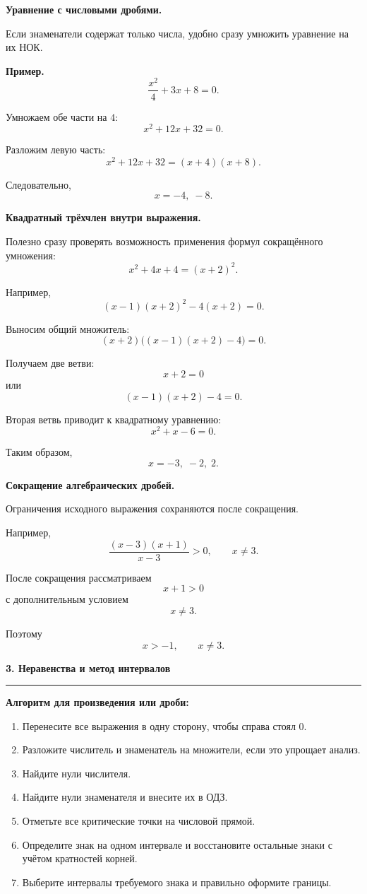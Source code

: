 \documentclass[a4paper,12pt]{article}
\newcommand{\topic}[1]{%
  \vspace{0.8em}%
  {\Large\bfseries\color{darkaccent}#1}\par
  \vspace{0.25em}%
  {\color{accent}\rule{\linewidth}{0.6pt}}\par
  \vspace{0.45em}%
}
\newcommand{\key}[1]{%
  \textbf{\color{darkaccent}#1}%
}
\begin{document}
\key{Уравнение с числовыми дробями.}
Если знаменатели содержат только числа, удобно сразу умножить
уравнение на их НОК.

\textbf{Пример.}
\[
\frac{x^2}{4}+3x+8=0.
\]

Умножаем обе части на \(4\):
\[
x^2+12x+32=0.
\]

Разложим левую часть:
\[
x^2+12x+32=(x+4)(x+8).
\]

Следовательно,
\[
\boxed{x=-4,\;-8}.
\]

\key{Квадратный трёхчлен внутри выражения.}
Полезно сразу проверять возможность применения формул сокращённого
умножения:
\[
x^2+4x+4=(x+2)^2.
\]

Например,
\[
(x-1)(x+2)^2-4(x+2)=0.
\]

Выносим общий множитель:
\[
(x+2)\bigl((x-1)(x+2)-4\bigr)=0.
\]

Получаем две ветви:
\[
x+2=0
\]
или
\[
(x-1)(x+2)-4=0.
\]

Вторая ветвь приводит к квадратному уравнению:
\[
x^2+x-6=0.
\]

Таким образом,
\[
\boxed{x=-3,\;-2,\;2}.
\]

\key{Сокращение алгебраических дробей.}
Ограничения исходного выражения сохраняются после сокращения.

Например,
\[
\frac{(x-3)(x+1)}{x-3}>0,
\qquad x\ne3.
\]

После сокращения рассматриваем
\[
x+1>0
\]
с дополнительным условием
\[
x\ne3.
\]

Поэтому
\[
x>-1,
\qquad x\ne3.
\]


\topic{3. Неравенства и метод интервалов}

\key{Алгоритм для произведения или дроби:}

\begin{enumerate}
  \item Перенесите все выражения в одну сторону, чтобы справа стоял \(0\).

  \item Разложите числитель и знаменатель на множители, если это
  упрощает анализ.

  \item Найдите нули числителя.

  \item Найдите нули знаменателя и внесите их в ОДЗ.

  \item Отметьте все критические точки на числовой прямой.

  \item Определите знак на одном интервале и восстановите остальные
  знаки с учётом кратностей корней.

  \item Выберите интервалы требуемого знака и правильно оформите
  границы.
\end{enumerate}
\end{document}
